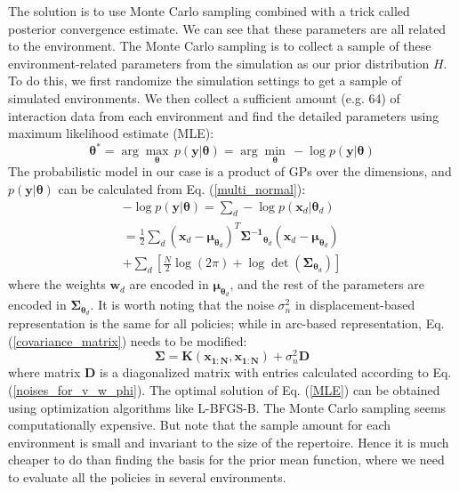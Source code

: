 The solution is to use Monte Carlo sampling combined with a trick called posterior convergence estimate.
We can see that these parameters are all related to the environment.
The Monte Carlo sampling is to collect a sample of these environment-related parameters from the simulation as our prior distribution $H$.
To do this, we first randomize the simulation settings to get a sample of simulated environments.
We then collect a sufficient amount (e.g. 64) of interaction data from each environment and find the detailed parameters using maximum likelihood estimate (MLE):
\begin{equation}
\bm{\theta}^* = 
\arg \max_{\bm{\theta}} \, p(\bm{y}|\bm{\theta})
= \arg \min_{\bm{\theta}} \, -\log p(\bm{y}|\bm{\theta})
\label{MLE}
\end{equation}
The probabilistic model in our case is a product of GPs over the dimensions, and $p(\bm{y}|\bm{\theta})$ can be calculated from Eq. (\ref{multi_normal}):
\begin{equation}
\begin{gathered}
-\log p(\bm{y}|\bm{\theta}) = \sum_{d} -\log p(\bm{x}_{d}|\bm{\theta}_d)
\\
= \frac{1}{2} \sum_{d}
(\bm{x}_{ d} - \bm{\mu}_{\bm{\theta}_d})^T \bm{\Sigma^{-1}}_{\bm{\theta}_d} (\bm{x}_{d} - \bm{\mu}_{\bm{\theta}_d})
\\ + \sum_{ d} \left[ \frac{N}{2}\log(2\pi) 
+ \log \det(\bm{\Sigma}_{ \bm{\theta}_d}) \right]
\end{gathered}
\label{nll}
\end{equation}
where the weights $\bm{w}_d$ are encoded in $\bm{\mu}_{\bm{\theta}_d}$, and the rest of the parameters are encoded in $\bm{\Sigma}_{\bm{\theta}_d}$.
It is worth noting that the noise $\sigma_n^2$ in displacement-based representation is the same for all policies; while in arc-based representation, Eq. (\ref{covariance_matrix}) needs to be modified:
\begin{equation}
\bm{\Sigma} = \bm{K}(\bm{x_{1:N}}, \bm{x_{1:N}}) + \sigma_{n}^2 \bm{D}
\label{modified_covariance_matrix}
\end{equation}
where matrix $\bm{D}$ is a diagonalized matrix with entries calculated according to Eq. (\ref{noises_for_v_w_phi}).
The optimal solution of Eq. (\ref{MLE}) can be obtained using optimization algorithms like L-BFGS-B. 
The Monte Carlo sampling seems computationally expensive. But note that the sample amount for each environment is small and invariant to the size of the repertoire.
Hence it is much cheaper to do than finding the basis for the prior mean function, where we need to evaluate all the policies in several environments.
